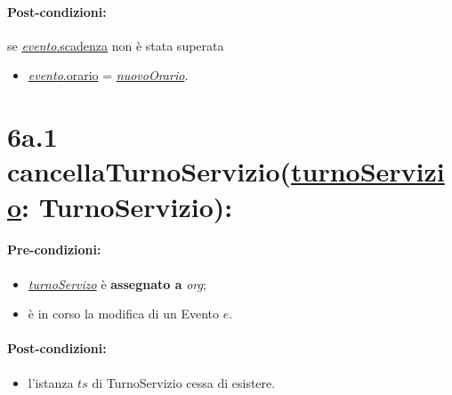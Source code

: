 \paragraph{Post-condizioni:}  se \underline{\textit{evento}.scadenza} non è stata superata

\begin{itemize}
    \item \underline{\textit{evento}.orario} = \underline{\textit{nuovoOrario}}.
\end{itemize}

\section*{6a.1 cancellaTurnoServizio(\underline{turnoServizio}: TurnoServizio):}

\paragraph{Pre-condizioni:}
\begin{itemize}
     \item \underline{\textit{turnoServizo}} è \textbf{assegnato a} {\textit{org}};
    \item è in corso la modifica di un Evento $e$.
\end{itemize}

\paragraph{Post-condizioni:} 

\begin{itemize}
    \item l'istanza $ts$ di TurnoServizio cessa di esistere.
\end{itemize}
